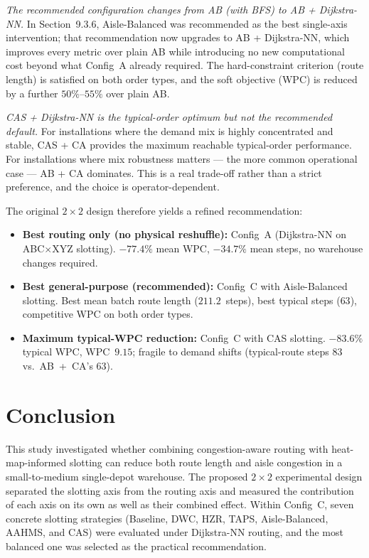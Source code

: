\documentclass[12pt,a4paper]{article}
\begin{document}
\emph{The recommended configuration changes from AB (with BFS) to
AB + Dijkstra-NN.}
In Section~9.3.6, Aisle-Balanced was recommended as the best
single-axis intervention; that recommendation now upgrades to
AB + Dijkstra-NN, which improves every metric over plain AB while
introducing no new computational cost beyond what Config~A already
required.
The hard-constraint criterion (route length) is satisfied on both
order types, and the soft objective (WPC) is reduced by a further
$50\%$--$55\%$ over plain AB.

\emph{CAS + Dijkstra-NN is the typical-order optimum but not the
recommended default.}
For installations where the demand mix is highly concentrated and
stable, CAS + CA provides the maximum reachable typical-order
performance.
For installations where mix robustness matters --- the more common
operational case --- AB + CA dominates.
This is a real trade-off rather than a strict preference, and the
choice is operator-dependent.

The original $2\times2$ design therefore yields a refined recommendation:
\begin{itemize}
  \item \textbf{Best routing only (no physical reshuffle):} Config~A
        (Dijkstra-NN on ABC$\times$XYZ slotting). $-77.4\%$ mean WPC,
        $-34.7\%$ mean steps, no warehouse changes required.
  \item \textbf{Best general-purpose (recommended):} Config~C with
        Aisle-Balanced slotting. Best mean batch route length ($211.2$~steps),
        best typical steps ($63$), competitive WPC on both order types.
  \item \textbf{Maximum typical-WPC reduction:}
        Config~C with CAS slotting. $-83.6\%$ typical WPC,
        WPC~$9.15$; fragile to demand shifts
        (typical-route steps $83$ vs.\ AB~+~CA's $63$).
\end{itemize}

\section{Conclusion}

This study investigated whether combining congestion-aware routing with
heat-map-informed slotting can reduce both route length and aisle
congestion in a small-to-medium single-depot warehouse. The proposed
$2 \times 2$ experimental design separated the slotting axis from the
routing axis and measured the contribution of each axis on its own
as well as their combined effect. Within Config~C, seven concrete
slotting strategies (Baseline, DWC, HZR, TAPS, Aisle-Balanced, AAHMS,
and CAS) were evaluated under Dijkstra-NN routing, and the most balanced
one was selected as the practical recommendation.
\end{document}
